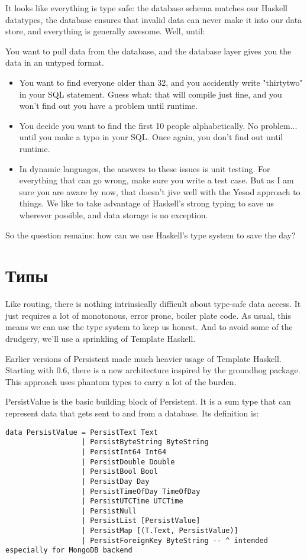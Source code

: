 It looks like everything is type safe: the database schema matches our Haskell datatypes, the database ensures that invalid data can never make it into our data store, and everything is generally awesome. Well, until:

You want to pull data from the database, and the database layer gives you the data in an untyped format.

\begin{itemize}
  \item You want to find everyone older than 32, and you accidently write "thirtytwo" in your SQL statement. Guess what: that will compile just fine, and you won't find out you have a problem until runtime.
  \item You decide you want to find the first 10 people alphabetically. No problem... until you make a typo in your SQL. Once again, you don't find out until runtime.
  \item In dynamic languages, the answers to these issues is unit testing. For everything that can go wrong, make sure you write a test case. But as I am sure you are aware by now, that doesn't jive well with the Yesod approach to things. We like to take advantage of Haskell's strong typing to save us wherever possible, and data storage is no exception.
\end{itemize}

So the question remains: how can we use Haskell's type system to save the day?

\section{Типы} %

Like routing, there is nothing intrinsically difficult about type-safe data access. It just requires a lot of monotonous, error prone, boiler plate code. As usual, this means we can use the type system to keep us honest. And to avoid some of the drudgery, we'll use a sprinkling of Template Haskell.

Earlier versions of Persistent made much heavier usage of Template Haskell. Starting with 0.6, there is a new architecture inspired by the groundhog package. This approach uses phantom types to carry a lot of the burden.

PersistValue is the basic building block of Persistent. It is a sum type that can represent data that gets sent to and from a database. Its definition is:

\begin{lstlisting}
data PersistValue = PersistText Text
                  | PersistByteString ByteString
                  | PersistInt64 Int64
                  | PersistDouble Double
                  | PersistBool Bool
                  | PersistDay Day
                  | PersistTimeOfDay TimeOfDay
                  | PersistUTCTime UTCTime
                  | PersistNull
                  | PersistList [PersistValue]
                  | PersistMap [(T.Text, PersistValue)]
                  | PersistForeignKey ByteString -- ^ intended especially for MongoDB backend
\end{lstlisting}

